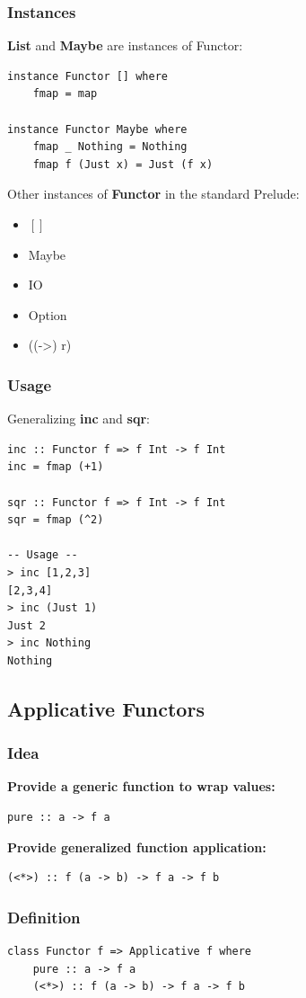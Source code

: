 \subsubsection{Instances}
\textbf{List} and \textbf{Maybe} are instances of Functor:
\begin{lstlisting}
instance Functor [] where 
    fmap = map

instance Functor Maybe where   
    fmap _ Nothing = Nothing 
    fmap f (Just x) = Just (f x)
\end{lstlisting}
Other instances of \textbf{Functor} in the standard Prelude:
\begin{itemize}
    \item $[]$
    \item Maybe
    \item IO
    \item Option
    \item ((-\textgreater) r)
\end{itemize}

\subsubsection{Usage}
Generalizing \textbf{inc} and \textbf{sqr}:
\begin{lstlisting}
inc :: Functor f => f Int -> f Int 
inc = fmap (+1)

sqr :: Functor f => f Int -> f Int 
sqr = fmap (^2)

-- Usage --
> inc [1,2,3]
[2,3,4]
> inc (Just 1)
Just 2
> inc Nothing
Nothing
\end{lstlisting}

\subsection{Applicative Functors}
\subsubsection{Idea}
\textbf{Provide a generic function to wrap values:}
\begin{lstlisting}
pure :: a -> f a
\end{lstlisting}
\textbf{Provide generalized function application:}
\begin{lstlisting}
(<*>) :: f (a -> b) -> f a -> f b
\end{lstlisting}

\subsubsection{Definition}
\begin{lstlisting}
class Functor f => Applicative f where 
    pure :: a -> f a
    (<*>) :: f (a -> b) -> f a -> f b
\end{lstlisting}

